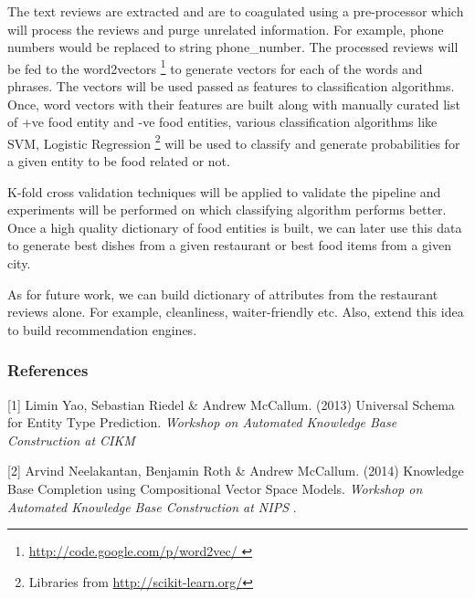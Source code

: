 \documentclass{article} %
\begin{document}
The text reviews are extracted and are to coagulated using a pre-processor which will process the reviews and purge unrelated information. For example, phone numbers would be replaced to string phone\_number. The processed reviews will be fed to the word2vectors \footnote{ \url{http://code.google.com/p/word2vec/ } } to generate vectors for each of the words and phrases. The vectors will be used passed as features to classification algorithms. Once, word vectors with their features are built along with manually curated list of +ve food entity and -ve food entities, various classification algorithms like SVM, Logistic Regression \footnote{ Libraries from \url{http://scikit-learn.org/}} will be used to classify and generate probabilities for a given entity to be food related or not.

K-fold cross validation techniques will be applied to validate the pipeline and experiments will be performed on which classifying algorithm performs better. Once a high quality dictionary of food entities is built, we can later use this data to generate best dishes from a given restaurant or best food items from a given city.

As for future work, we can build dictionary of attributes from the restaurant reviews alone. For example, cleanliness, waiter-friendly etc. Also, extend this idea to build recommendation engines. 

\subsubsection*{References}


\small{
[1] Limin Yao, Sebastian Riedel \& Andrew McCallum. (2013) 
Universal Schema for Entity Type Prediction. 
{\it Workshop on Automated Knowledge Base Construction at CIKM }

[2] Arvind Neelakantan, Benjamin Roth \& Andrew McCallum. (2014)
Knowledge Base Completion using Compositional Vector Space Models.
{\it Workshop on Automated Knowledge Base Construction  at NIPS }.
}
\end{document}
